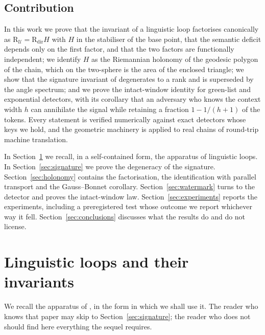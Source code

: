 \documentclass[11pt,a4paper]{article}
\theoremstyle{plain}
\theoremstyle{definition}
\numberwithin{equation}{section}
\newcommand{\Uc}{\mathcal{U}}
\begin{document}
\subsection*{Contribution}

In this work we prove that the invariant of a linguistic loop
factorises canonically as $\mathrm{R}_\Uc = \mathrm{R}_{\mathrm{dir}} H$
with $H$ in the stabiliser of the base point, that the semantic deficit
depends only on the first factor, and that the two factors are
functionally independent; we identify $H$ as the Riemannian holonomy of
the geodesic polygon of the chain, which on the two-sphere is the area
of the enclosed triangle; we show that the signature invariant of
\cite{CM25} degenerates to a rank and is superseded by the angle
spectrum; and we prove the intact-window identity for green-list and
exponential detectors, with its corollary that an adversary who knows
the context width $h$ can annihilate the signal while retaining a
fraction $1 - 1/(h+1)$ of the tokens. Every statement is verified
numerically against exact detectors whose keys we hold, and the
geometric machinery is applied to real chains of round-trip machine
translation.

In Section~\ref{sec:loops} we recall, in a self-contained form, the
apparatus of linguistic loops. In Section~\ref{sec:signature} we prove
the degeneracy of the signature. Section~\ref{sec:holonomy} contains the
factorisation, the identification with parallel transport and the
Gauss--Bonnet corollary. Section~\ref{sec:watermark} turns to the
detector and proves the intact-window law. Section~\ref{sec:experiments}
reports the experiments, including a preregistered test whose outcome we
report whichever way it fell. Section~\ref{sec:conclusions} discusses
what the results do and do not license.

\section{Linguistic loops and their invariants}\label{sec:loops}

We recall the apparatus of \cite{CM25}, in the form in which we shall
use it. The reader who knows that paper may skip to
Section~\ref{sec:signature}; the reader who does not should find here
everything the sequel requires.
\end{document}
